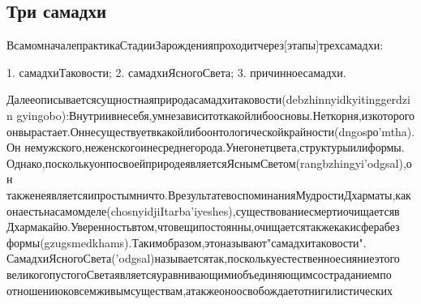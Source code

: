 \subsection{Три самадхи}

ВсамомначалепрактикаСтадииЗарожденияпроходитчерез[этапы]трехсамадхи:

1.  самадхиТаковости;
2.  самадхиЯсногоСвета;
3.  причинноесамадхи.

Далееописываетсясущностнаяприродасамадхитаковости(debzhinnyidkyitinggerdzin
gyingobo):Внутриивнесебя,умнезависитоткакойлибоосновы.Неткорня,изкоторого
онвырастает.Оннесуществуетвкакойлибоонтологическойкрайности(dngosро'mtha).Он
немужского,неженскогоинесреднегорода.Унегонетцвета,структурыилиформы.
Однако,посколькуонпосвоейприродеявляетсяЯснымСветом(rangbzhingyi’odgsal),он
такженеявляетсяипростымничто.ВрезультатевоспоминанияМудростиДхарматы,как
онаестьнасамомделе(chosnyidjiItarba'iyeshes),существованиесмертиочищаетсяв
Дхармакайю.Уверенностьвтом,чтовещипостоянны,очищаетсятакжекакисферабез
формы(gzugsmedkhams).Такимобразом,этоназывают"самадхитаковости".
СамадхиЯсногоСвета('odgsal)называетсятак,посколькуестественноесияниеэтого
великогопустогоСветаявляетсяуравнивающимиобъединяющимсостраданиемпо
отношениюковсемживымсуществам,атакжеоноосвобождаетотнигилистических
